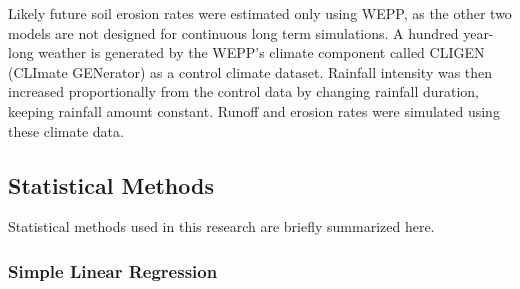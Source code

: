 % 
Likely future soil erosion rates were estimated only using WEPP, as the other
two models are not designed for continuous long term simulations. A hundred
year-long weather is generated by the WEPP's climate component called CLIGEN
(CLImate GENerator) as a control climate dataset. Rainfall intensity was
then increased proportionally from the control data by changing rainfall
duration, keeping rainfall amount constant. Runoff and erosion rates were
simulated using these climate data.

\subsection{Statistical Methods}
\label{StatisticalMethodsForTrendInvestigation}

Statistical methods used in this research are briefly summarized here.

\subsubsection{Simple Linear Regression}
\label{sec:SimpleLinearRegression}

